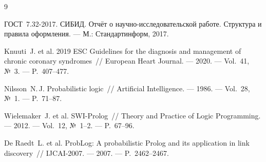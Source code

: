 \documentclass[14pt,a4paper]{extarticle}
\begin{document}
\begin{thebibliography}{9}
\sloppy

ГОСТ~7.32-2017. СИБИД. Отчёт о научно-исследовательской работе. Структура и правила оформления. --- М.: Стандартинформ, 2017.

Knuuti~J. et al. 2019 ESC Guidelines for the diagnosis and management of chronic coronary syndromes~// European Heart Journal. --- 2020. --- Vol.~41, №~3. --- P.~407--477.

Nilsson~N.\,J. Probabilistic logic~// Artificial Intelligence. --- 1986. --- Vol.~28, №~1. --- P.~71--87.

Wielemaker~J. et al. SWI-Prolog~// Theory and Practice of Logic Programming. --- 2012. --- Vol.~12, №~1--2. --- P.~67--96.

De Raedt~L. et al. ProbLog: A probabilistic Prolog and its application in link discovery~// IJCAI-2007. --- 2007. --- P.~2462--2467.

\end{thebibliography}
\end{document}

